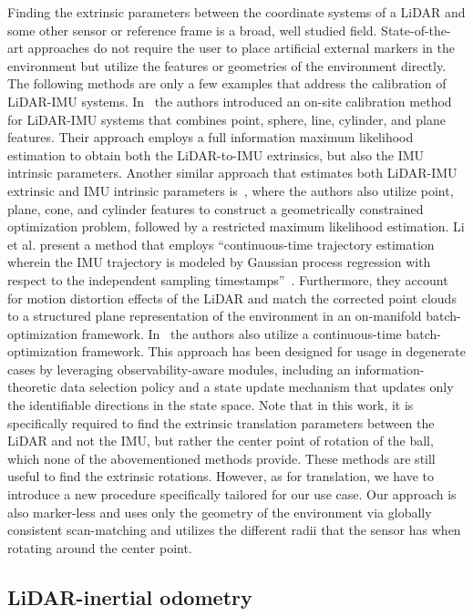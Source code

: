 Finding the extrinsic parameters between the coordinate systems of a LiDAR and some other sensor or reference frame is a broad, well studied field.
State-of-the-art approaches do not require the user to place artificial external markers in the environment but utilize the features or geometries of the environment directly.
The following methods are only a few examples that address the calibration of LiDAR-IMU systems.
In~\cite{Liu2020NovelMultifeature} the authors introduced an on-site calibration method for LiDAR-IMU systems that combines point, sphere, line, cylinder, and plane features.
Their approach employs a full information maximum likelihood estimation to obtain both the LiDAR-to-IMU extrinsics, but also the IMU intrinsic parameters.
Another similar approach that estimates both LiDAR-IMU extrinsic and IMU intrinsic parameters is~\cite{Liu2019ErrorModeling}, where the authors also utilize point, plane, cone, and cylinder features to construct a geometrically constrained optimization problem, followed by a restricted maximum likelihood estimation.
Li et al. present a method that employs ``continuous-time trajectory estimation wherein the IMU trajectory is modeled by Gaussian process regression with respect to the independent sampling timestamps''~\cite{Li2021CTTrajectory}.
Furthermore, they account for motion distortion effects of the LiDAR and match the corrected point clouds to a structured plane representation of the environment in an on-manifold batch-optimization framework.
In~\cite{Lv2022ObservabilityAware} the authors also utilize a continuous-time batch-optimization framework.
This approach has been designed for usage in degenerate cases by leveraging observability-aware modules, including an information-theoretic data selection policy and a state update mechanism that updates only the identifiable directions in the state space.
Note that in this work, it is specifically required to find the extrinsic translation parameters between the LiDAR and not the IMU, but rather the center point of rotation of the ball, which none of the abovementioned methods provide. 
These methods are still useful to find the extrinsic rotations.
However, as for translation, we have to introduce a new procedure specifically tailored for our use case.
Our approach is also marker-less and uses only the geometry of the environment via globally consistent scan-matching and utilizes the different radii that the sensor has when rotating around the center point.

\subsection{LiDAR-inertial odometry}

